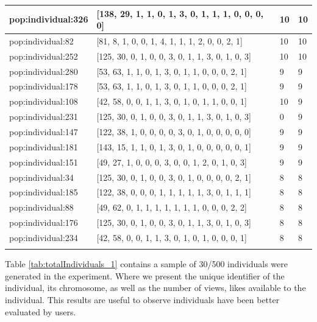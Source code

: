 \begin{table}
\begin{tabular}{p{3cm} p{4cm} p{3cm} p{3cm}}
\small{pop:individual:326} & \small{[138, 29, 1, 1, 0, 1, 3, 0, 1, 1, 1, 0, 0, 0, 0]} 
& \small{10} & \small{10}\\ \hline 
\small{pop:individual:82} & \small{[81, 8, 1, 0, 0, 1, 4, 1, 1, 1, 2, 0, 0, 2, 1]} 
& \small{10} & \small{10}\\ \hline 
\small{pop:individual:252} & \small{[125, 30, 0, 1, 0, 0, 3, 0, 1, 1, 3, 0, 1, 0, 3]} 
& \small{10} & \small{10}\\ \hline 
\small{pop:individual:280} & \small{[53, 63, 1, 1, 0, 1, 3, 0, 1, 1, 0, 0, 0, 2, 1]} 
& \small{9} & \small{9}\\ \hline 
\small{pop:individual:178} & \small{[53, 63, 1, 1, 0, 1, 3, 0, 1, 1, 0, 0, 0, 2, 1]} 
& \small{9} & \small{9}\\ \hline 
\small{pop:individual:108} & \small{[42, 58, 0, 0, 1, 1, 3, 0, 1, 0, 1, 1, 0, 0, 1]} 
& \small{10} & \small{9}\\ \hline 
\small{pop:individual:231} & \small{[125, 30, 0, 1, 0, 0, 3, 0, 1, 1, 3, 0, 1, 0, 3]} 
& \small{0} & \small{9}\\ \hline 
\small{pop:individual:147} & \small{[122, 38, 1, 0, 0, 0, 0, 3, 0, 1, 0, 0, 0, 0, 0]} 
& \small{9} & \small{9}\\ \hline 
\small{pop:individual:181} & \small{[143, 15, 1, 1, 0, 1, 3, 0, 1, 0, 0, 0, 0, 0, 1]} 
& \small{9} & \small{9}\\ \hline 
\small{pop:individual:151} & \small{[49, 27, 1, 0, 0, 0, 3, 0, 0, 1, 2, 0, 1, 0, 3]} 
& \small{9} & \small{9}\\ \hline 
\small{pop:individual:34} & \small{[125, 30, 0, 1, 0, 0, 3, 0, 1, 0, 0, 0, 0, 2, 1]} 
& \small{8} & \small{8}\\ \hline 
\small{pop:individual:185} & \small{[122, 38, 0, 0, 0, 1, 1, 1, 1, 1, 3, 0, 1, 1, 1]} 
& \small{8} & \small{8}\\ \hline 
\small{pop:individual:88} & \small{[49, 62, 0, 1, 1, 1, 1, 1, 1, 1, 0, 0, 0, 2, 2]} 
& \small{8} & \small{8}\\ \hline 
\small{pop:individual:176} & \small{[125, 30, 0, 1, 0, 0, 3, 0, 1, 1, 3, 0, 1, 0, 3]} 
& \small{8} & \small{8}\\ \hline 
\small{pop:individual:234} & \small{[42, 58, 0, 0, 1, 1, 3, 0, 1, 0, 1, 0, 0, 0, 1]} 
& \small{8} & \small{8}\\ \hline    
\noalign{\smallskip}\hline
\end{tabular}
\end{table}

Table \ref{tab:totalIndividuals_1} contains a sample of 30/500 individuals were
generated in the experiment. Where we present the unique identifier of the
individual, its chromosome, as well as the number of views, likes available to
the individual. This results are useful to observe individuals have been better
evaluated by users.

